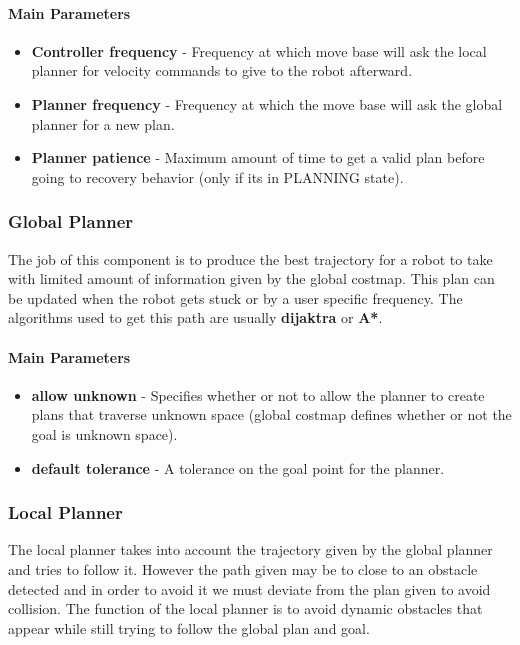 \documentclass[12pt]{article}
\begin{document}
\paragraph{Main Parameters}
\begin{itemize}[label={}]
    \item \textbf{Controller frequency} - Frequency at which move base will ask the local planner for velocity commands to give to the robot afterward.
    \item \textbf{Planner frequency} - Frequency at which the move base will ask the global planner for a new plan.
    \item \textbf{Planner patience} - Maximum amount of time to get a valid plan before going to recovery behavior (only if its in PLANNING state).
\end{itemize}

\subsubsection{Global Planner}
The job of this component is to produce the best trajectory for a robot to take with limited amount of information given by the global costmap. This plan can be updated when the robot gets stuck or by a user specific frequency. The algorithms used to get this path are usually \textbf{dijaktra} or \textbf{A*}. 
\paragraph{Main Parameters}
\begin{itemize}[label={}]
    \item \textbf{allow unknown} - Specifies whether or not to allow the planner to create plans that traverse unknown space (global costmap defines whether or not the goal is unknown space).
    \item \textbf{default tolerance} - A tolerance on the goal point for the planner.
\end{itemize}
\subsubsection{Local Planner}
The local planner takes into account the trajectory given by the global planner and tries to follow it. However the path given may be to close to an obstacle detected and in order to avoid it we must deviate from the plan given to avoid collision. The function of the local planner is to avoid dynamic obstacles that appear while still trying to follow the global plan and goal. 
\end{document}
